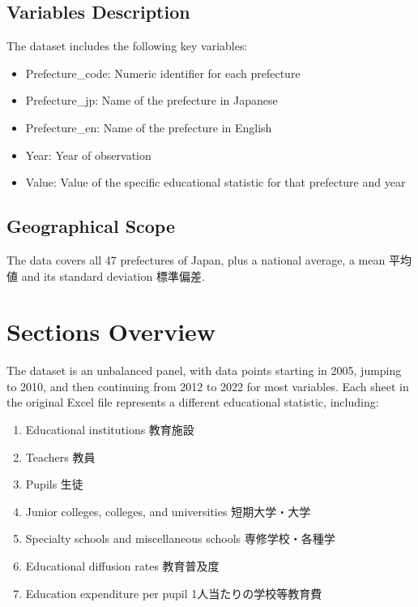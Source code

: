 \documentclass[
]{ltjarticle}
\providecommand{\tightlist}{%
  \setlength{\itemsep}{0pt}\setlength{\parskip}{0pt}}\usepackage{longtable,booktabs,array}
\begin{document}
\hypertarget{variables-description}{%
\subsection{Variables Description}\label{variables-description}}

The dataset includes the following key variables:

\begin{itemize}
\tightlist
\item
  Prefecture\_code: Numeric identifier for each prefecture
\item
  Prefecture\_jp: Name of the prefecture in Japanese
\item
  Prefecture\_en: Name of the prefecture in English
\item
  Year: Year of observation
\item
  Value: Value of the specific educational statistic for that prefecture
  and year
\end{itemize}

\hypertarget{geographical-scope}{%
\subsection{Geographical Scope}\label{geographical-scope}}

The data covers all 47 prefectures of Japan, plus a national average, a
mean 平均値 and its standard deviation 標準偏差.

\hypertarget{sections-overview}{%
\section{Sections Overview}\label{sections-overview}}

The dataset is an unbalanced panel, with data points starting in 2005,
jumping to 2010, and then continuing from 2012 to 2022 for most
variables. Each sheet in the original Excel file represents a different
educational statistic, including:

\begin{enumerate}
\def\labelenumi{\arabic{enumi}.}
\tightlist
\item
  Educational institutions 教育施設
\item
  Teachers 教員
\item
  Pupils 生徒
\item
  Junior colleges, colleges, and universities 短期大学・大学
\item
  Specialty schools and miscellaneous schools 専修学校・各種学
\item
  Educational diffusion rates 教育普及度
\item
  Education expenditure per pupil 1人当たりの学校等教育費
\end{enumerate}
\end{document}

